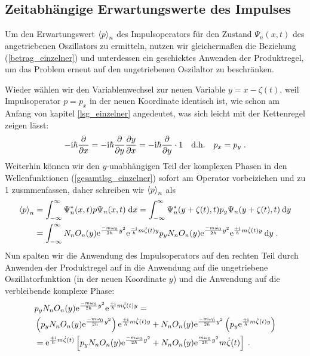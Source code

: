     \newpage





  \subsection{Zeitabhängige Erwartungswerte des Impulses}
    Um den Erwartungswert $\braket{p}_n$ des Impulsoperators für den Zustand $\Psi_n(x,t)$ des angetriebenen Oszillators zu ermitteln, nutzen wir gleichermaßen die Beziehung (\ref{betrag_einzelner}) und unterdessen ein geschicktes Anwenden der Produktregel, um das Problem erneut auf den ungetriebenen Oszilaltor zu beschränken.

    Wieder wählen wir den Variablenwechsel zur neuen Variable $y=x-\zeta(t)$, weil Impulsoperator $p=p_x$ in der neuen Koordinate identisch ist, wie schon am Anfang von kapitel \ref{lsg_einzelner} angedeutet, was sich leicht mit der Kettenregel zeigen lässt:
    \begin{equation}
      -\text i\hbar \frac{\partial}{\partial x} = -\text i\hbar \frac{\partial}{\partial y}\frac{\partial y}{\partial x} = -\text i\hbar \frac{\partial}{\partial y} \cdot 1 \quad \text{d.h.} \quad p_x = p_y \; .
    \end{equation}
    Weiterhin können wir den $y$-unabhängigen Teil der komplexen Phasen in den Wellenfunktionen (\ref{gesamtlsg_einzelner}) sofort am Operator vorbeiziehen und zu 1 zusmmenfassen, daher schreiben wir $\braket{p}_n$ als
    \begin{align}
      \braket{p}_n &= \int_{-\infty}^{\infty} \Psi^*_n(x,t) p \Psi_n(x,t) \; \text dx
      = \int_{-\infty}^{\infty} \Psi^*_n(y+\zeta(t),t) p_y \Psi_n(y+\zeta(t),t) \: \text dy \notag\\
      &= \int_{-\infty}^{\infty} N_nO_n(y)\text e^{\frac{-m\omega_0}{2\hbar}y^2}\text e^{\frac{-\text i}{\hbar}m\dot{\zeta}(t)y} p_y N_nO_n(y)\text e^{\frac{-m\omega_0}{2\hbar}y^2}\text e^{\frac{+\text i}{\hbar}m\dot{\zeta}(t)y} \: \text dy \; .
      \label{spaste}
    \end{align}
    Nun spalten wir die Anwendung des Impulsoperators auf den rechten Teil durch Anwenden der Produktregel auf in die Anwendung auf die ungetriebene Oszillatorfunktion (in der neuen Koordinate $y$) und die Anwendung auf die verbleibende komplexe Phase:
    \begin{align}
      &p_y N_nO_n(y)\text e^{\frac{-m\omega_0}{2\hbar}y^2}\text e^{\frac{+\text i}{\hbar}m\dot{\zeta}(t)y} = \notag\\
      &\left(p_y N_nO_n(y)\text e^{\frac{-m\omega_0}{2\hbar}y^2}\right) \text e^{\frac{+\text i}{\hbar}m\dot{\zeta}(t)y}
      + N_nO_n(y)\text e^{\frac{-m\omega_0}{2\hbar}y^2} \left(p_y \text e^{\frac{+\text i}{\hbar}m\dot{\zeta}(t)y}\right) \notag\\
      &= \text e^{\frac{+\text i}{\hbar}m\dot{\zeta}(t)} \left[p_yN_nO_n(y)\text e^{\frac{-m\omega_0}{2\hbar}y^2} + N_nO_n(y)\text e^{\frac{m\omega_0}{2\hbar}y^2}m\dot{\zeta}(t) \right] \; .
      \label{spaste2}
    \end{align}
